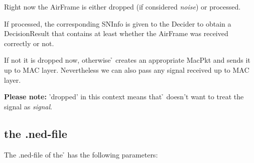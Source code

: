 Right now the AirFrame is either dropped (if considered \textit{noise}) or
processed.

If processed, the corresponding SNInfo is given to the Decider to obtain a
DecisionResult that contains at least whether the AirFrame was received
correctly or not.

If not it is dropped now, otherwise \h{\bp} creates an appropriate MacPkt and
sends it up to MAC layer. Nevertheless we can also pass any signal received up
to MAC layer.

\textbf{Please note:} 'dropped' in this context means that \h{\bp} doesn't want
to treat the signal as \textit{signal}.










\subsection{the .ned-file}

The .ned-file of the \h{\bp} has the following parameters:

